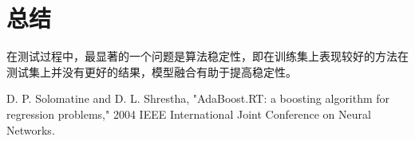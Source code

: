 \documentclass{cjc}
\begin{document}
\section{总结}
在测试过程中，最显著的一个问题是算法稳定性，即在训练集上表现较好的方法在测试集上并没有更好的结果，模型融合有助于提高稳定性。

\nocite{*}


% 

\renewcommand{\baselinestretch}{1.6}
\begin{thebibliography}{00}

  D. P. Solomatine and D. L. Shrestha, "AdaBoost.RT: a boosting algorithm for regression problems," 2004 IEEE International Joint Conference on Neural Networks.
 

\end{thebibliography}
% 
\end{document}
